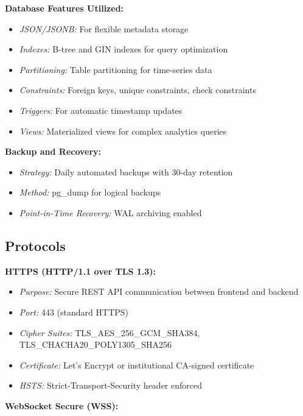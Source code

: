 \documentclass[12pt,a4paper]{article}
\begin{document}
\textbf{Database Features Utilized:}

\begin{itemize}
    \item \textit{JSON/JSONB:} For flexible metadata storage
    \item \textit{Indexes:} B-tree and GIN indexes for query optimization
    \item \textit{Partitioning:} Table partitioning for time-series data
    \item \textit{Constraints:} Foreign keys, unique constraints, check constraints
    \item \textit{Triggers:} For automatic timestamp updates
    \item \textit{Views:} Materialized views for complex analytics queries
\end{itemize}

\textbf{Backup and Recovery:}

\begin{itemize}
    \item \textit{Strategy:} Daily automated backups with 30-day retention
    \item \textit{Method:} pg\_dump for logical backups
    \item \textit{Point-in-Time Recovery:} WAL archiving enabled
\end{itemize}
\subsection{Protocols}
\label{sec:protocols}

\textbf{HTTPS (HTTP/1.1 over TLS 1.3):}

\begin{itemize}
    \item \textit{Purpose:} Secure REST API communication between frontend and backend
    \item \textit{Port:} 443 (standard HTTPS)
    \item \textit{Cipher Suites:} TLS\_AES\_256\_GCM\_SHA384, TLS\_CHACHA20\_POLY1305\_SHA256
    \item \textit{Certificate:} Let's Encrypt or institutional CA-signed certificate
    \item \textit{HSTS:} Strict-Transport-Security header enforced
\end{itemize}

\textbf{WebSocket Secure (WSS):}
\end{document}
